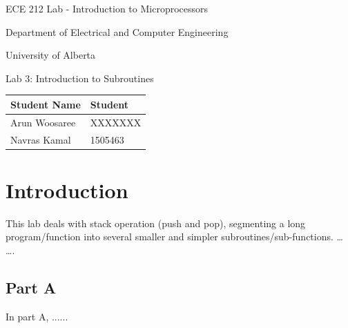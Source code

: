 \documentclass[letterpaper]{article}
\begin{document}
  \begin{titlepage}
    \begin{center}

      \LARGE
      ECE 212 Lab - Introduction to Microprocessors

      Department of Electrical and Computer Engineering

      University of Alberta

      \vspace{2cm}

      Lab 3: Introduction to Subroutines

      \vspace{5cm}
      \Large

      \begin{tabular}{ | m{5cm} | m{5cm} | }
        \hline
        Student Name & Student \\
        \hline
        Arun Woosaree & XXXXXXX \\
        \hline
        Navras Kamal & 1505463 \\
        \hline
      \end{tabular}




    \end{center}
\end{titlepage}


\tableofcontents

\newpage

\section{Introduction}
This lab deals with stack operation (push and pop), segmenting a long program/function into several smaller and simpler subroutines/sub-functions. … ….


  \subsection{Part A}
  In part A, ......
\end{document}
